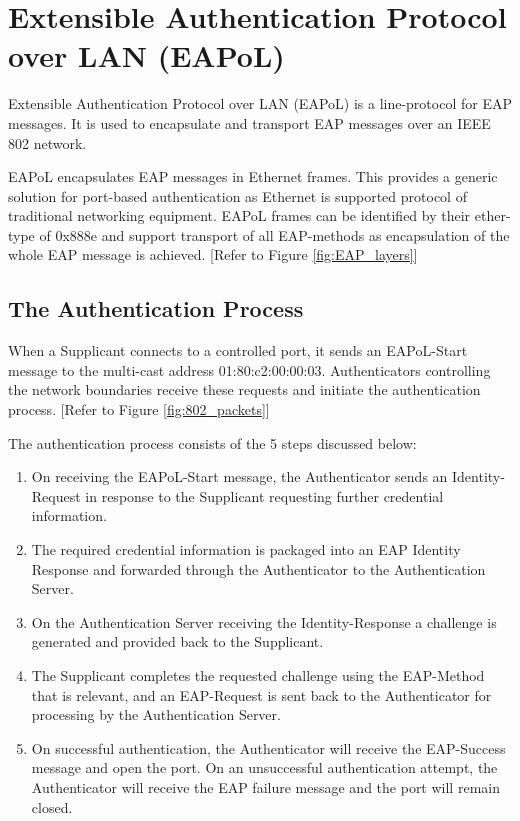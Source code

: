 \section{Extensible Authentication Protocol over LAN (EAPoL)}
Extensible Authentication Protocol over LAN (EAPoL) is a line-protocol for EAP messages. It is used to encapsulate and transport EAP messages over an IEEE 802 network.

EAPoL encapsulates EAP messages in Ethernet frames. This provides a generic solution for port-based authentication as Ethernet is supported protocol of traditional networking equipment. 
EAPoL frames can be identified by their ether-type of 0x888e and support transport of all EAP-methods as encapsulation of the whole EAP message is achieved. [Refer to Figure \ref{fig:EAP_layers}] 

\subsection{The Authentication Process}
When a Supplicant connects to a controlled port, it sends an EAPoL-Start message to the multi-cast address 01:80:c2:00:00:03. Authenticators controlling the network boundaries receive these requests and initiate the authentication process. [Refer to Figure \ref{fig:802_packets}]

The authentication process consists of the 5 steps discussed below:
\begin{enumerate}
    \item On receiving the EAPoL-Start message, the Authenticator sends an Identity-Request in response to the Supplicant requesting further credential information.
    
    \item The required credential information is packaged into an EAP Identity Response and forwarded through the Authenticator to the Authentication Server.

    \item On the Authentication Server receiving the Identity-Response a challenge is generated and provided back to the Supplicant.

    \item The Supplicant completes the requested challenge using the EAP-Method that is relevant, and an EAP-Request is sent back to the Authenticator for processing by the Authentication Server.

    \item On successful authentication, the Authenticator will receive the EAP-Success message and open the port. On an unsuccessful authentication attempt, the Authenticator will receive the EAP failure message and the port will remain closed. 
    
\end{enumerate}

